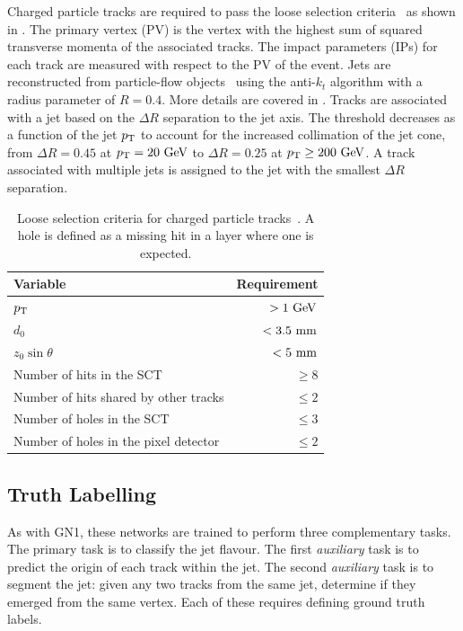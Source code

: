 Charged particle tracks are required to pass the loose selection criteria~\cite{DL1D} as shown in .
The primary vertex (PV) is the vertex with the highest sum of squared transverse momenta of the associated tracks.
The impact parameters (IPs) for each track are measured with respect to the PV of the event.
Jets are reconstructed from particle-flow objects~\cite{PFlow} using the anti-$k_t$ algorithm with a radius parameter of $R = 0.4$.
More details are covered in .
Tracks are associated with a jet based on the $\Delta R$ separation to the jet axis.
The threshold decreases as a function of the jet $p_{\text{T}}$ to account for the increased collimation of the jet cone, from $\Delta R = 0.45$ at $\pt = 20~\GeV$ to $\Delta R = 0.25$ at $\pt \geq 200~\GeV$.
A track associated with multiple jets is assigned to the jet with the smallest $\Delta R$ separation.

\begin{table}
    \centering
    \begin{tabular}{lr}
        \toprule
        Variable & Requirement \\
        \midrule
        $p_{\text{T}}$ & $> 1~\GeV$ \\
        $d_0$ & $< 3.5~\mm$ \\
        $z_0 \sin \theta$ & $< 5~\mm$ \\
        Number of hits in the SCT & $\geq 8$ \\
        Number of hits shared by other tracks & $\leq 2$ \\
        Number of holes in the SCT & $\leq 3$ \\
        Number of holes in the pixel detector & $\leq 2$ \\
        \bottomrule
    \end{tabular}
    \caption{Loose selection criteria for charged particle tracks~\cite{DL1D}. A hole is defined as a missing hit in a layer where one is expected.}
    \label{tab:track_loose}
\end{table}

\subsection{Truth Labelling}

As with GN1, these networks are trained to perform three complementary tasks.
The primary task is to classify the jet flavour.
The first \textit{auxiliary} task is to predict the origin of each track within the jet. The second \textit{auxiliary} task is to segment the jet: given any two tracks from the same jet, determine if they emerged from the same vertex. Each of these requires defining ground truth labels.

